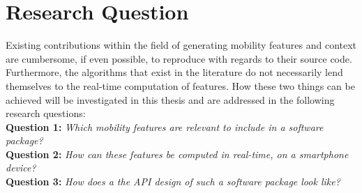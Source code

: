 \section{Research Question}

Existing contributions within the field of generating mobility features and context are cumbersome, if even possible, to reproduce with regards to their source code. Furthermore, the algorithms that exist in the literature do not necessarily lend themselves to the real-time computation of features. How these two things can be achieved will be investigated in this thesis and are addressed in the following research questions:\\

\textbf{Question 1:} \textit{Which mobility features are relevant to include in a software package?}\\

\textbf{Question 2:} \textit{How can these features be computed in real-time, on a smartphone device?}\\

\textbf{Question 3:} \textit{How does a the API design of such a software package look like?}\\
